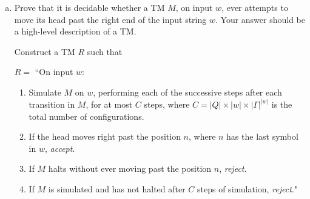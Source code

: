 \documentclass{article}
\begin{document}
\begin{enumerate}[(a)]
            On a case basis:
            \begin{enumerate}[-]
                \item $M$ accepts $w$: $M'$ will move left past the first cell. $R$ accepts $\langle M', \varepsilon \rangle$. $S$ accepts $\langle M, w \rangle$.

                \item $M$ rejects $w$: $M'$ will move left past the first cell. $R$ accepts $\langle M', \varepsilon \rangle$. $S$ accepts $\langle M, w \rangle$.

                \item $M$ loops on $w$: $M'$ will not move left past the first cell. $R$ rejects $\langle M', \varepsilon \rangle$. $S$ rejects $\langle M, w \rangle$.
            \end{enumerate}

            Since $S$ decides $\text{A}_\text{TM}$, but $\text{A}_\text{TM}$ is undecidable, we have a contradiction. Therefore, $\text{LEFT}_\text{TM}$ is undecidable.

        \item Prove that it is decidable whether a TM $M$, on input $w$, ever attempts to move its head past the right end of the input string $w$. Your answer should be a high-level description of a TM. 

            Construct a TM $R$ such that

            $R = $ ``On input $w$:
            \begin{enumerate}[1.]
                \item Simulate $M$ on $w$, performing each of the successive steps after each transition in $M$, for at most $C$ steps, where $C = |Q| \times |w| \times |\Gamma|^{|w|}$ is the total number of configurations.

                \item If the head moves right past the position $n$, where $n$ has the last symbol in $w$, \textit{accept}.

                \item If $M$ halts without ever moving past the position $n$, \textit{reject}.

                \item If $M$ is simulated and has not halted after $C$ steps of simulation, \textit{reject}."
            \end{enumerate}
            
    \end{enumerate}
\end{document}
